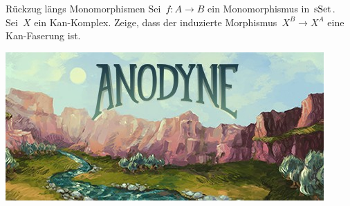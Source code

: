 \documentclass{uebblatt}
\begin{document}
\begin{aufgabe}{Rückzug längs Monomorphismen}
Sei~$f : A \to B$ ein Monomorphismus in~$\mathrm{sSet}$. Sei~$X$ ein Kan-Komplex.
Zeige, dass der induzierte Morphismus~$X^B \to X^A$ eine Kan-Faserung ist.
\end{aufgabe}

\vfill
\centering
\href{http://www.anodynegame.com/}{\includegraphics[scale=0.85]{images/anodyne}}
\par
\end{document}
